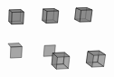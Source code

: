 \documentclass[orivec]{llncs} \usepackage[T1]{fontenc}
\begin{document}
\begin{example}
\[\begin{tikzpicture}[line join=round,opacity=0.7]
\filldraw[fill=gray](2.616,1.165)--(2.912,1.175)--(2.95,1.487)--(2.651,1.478)--cycle;
\filldraw[fill=gray](2.755,1.094)--(3.061,1.104)--(2.912,1.175)--(2.616,1.165)--cycle;
\filldraw[fill=gray](3.061,1.104)--(3.103,1.426)--(2.95,1.487)--(2.912,1.175)--cycle;
\filldraw[fill=gray](.829,.39)--(1.146,.404)--(1.062,.5)--(.756,.487)--cycle;
\filldraw[fill=gray](2.755,1.094)--(2.793,1.417)--(2.651,1.478)--(2.616,1.165)--cycle;
\filldraw[fill=gray](1.746,.13)--(2.05,.145)--(2.077,.446)--(1.77,.432)--cycle;
\filldraw[fill=gray](2.793,1.417)--(3.103,1.426)--(2.95,1.487)--(2.651,1.478)--cycle;
\filldraw[fill=gray](2.134,1.072)--(2.164,1.398)--(2.042,1.461)--(2.015,1.145)--cycle;
\filldraw[fill=gray](1.71,1.135)--(2.015,1.145)--(2.042,1.461)--(1.733,1.452)--cycle;
\filldraw[fill=gray](1.819,1.061)--(2.134,1.072)--(2.015,1.145)--(1.71,1.135)--cycle;
\filldraw[fill=gray](1.819,1.061)--(1.844,1.389)--(1.733,1.452)--(1.71,1.135)--cycle;
\filldraw[fill=gray](.818,.084)--(1.131,.1)--(1.146,.404)--(.829,.39)--cycle;
\filldraw[fill=gray](1.844,1.389)--(2.164,1.398)--(2.042,1.461)--(1.733,1.452)--cycle;
\filldraw[fill=gray](1.178,1.039)--(1.195,1.37)--(1.106,1.435)--(1.091,1.115)--cycle;
\filldraw[fill=gray](.777,1.104)--(1.091,1.115)--(1.106,1.435)--(.787,1.426)--cycle;
\filldraw[fill=gray](.853,1.028)--(1.178,1.039)--(1.091,1.115)--(.777,1.104)--cycle;
\filldraw[fill=gray](.853,1.028)--(.865,1.36)--(.787,1.426)--(.777,1.104)--cycle;
\filldraw[fill=gray](2.755,1.094)--(3.061,1.104)--(3.103,1.426)--(2.793,1.417)--cycle;
\filldraw[fill=gray](.865,1.36)--(1.195,1.37)--(1.106,1.435)--(.787,1.426)--cycle;
\filldraw[fill=gray](1.819,1.061)--(2.134,1.072)--(2.164,1.398)--(1.844,1.389)--cycle;
\filldraw[fill=gray](.853,1.028)--(1.178,1.039)--(1.195,1.37)--(.865,1.36)--cycle;
\filldraw[fill=gray](2.937,-.046)--(3.251,-.029)--(3.297,.287)--(2.979,.271)--cycle;
\filldraw[fill=gray](3.098,-.169)--(3.424,-.151)--(3.251,-.029)--(2.937,-.046)--cycle;
\filldraw[fill=gray](3.424,-.151)--(3.474,.175)--(3.297,.287)--(3.251,-.029)--cycle;
\filldraw[fill=gray](3.098,-.169)--(3.144,.158)--(2.979,.271)--(2.937,-.046)--cycle;
\filldraw[fill=gray](3.144,.158)--(3.474,.175)--(3.297,.287)--(2.979,.271)--cycle;
\filldraw[fill=gray](2.436,-.206)--(2.473,.125)--(2.331,.24)--(2.298,-.08)--cycle;
\filldraw[fill=gray](2.1,-.225)--(2.436,-.206)--(2.298,-.08)--(1.973,-.098)--cycle;
\filldraw[fill=gray](1.973,-.098)--(2.298,-.08)--(2.331,.24)--(2.002,.224)--cycle;
\filldraw[fill=gray](2.1,-.225)--(2.132,.107)--(2.002,.224)--(1.973,-.098)--cycle;
\filldraw[fill=gray](2.132,.107)--(2.473,.125)--(2.331,.24)--(2.002,.224)--cycle;

\end{tikzpicture}\]
\end{example}
\end{document}
